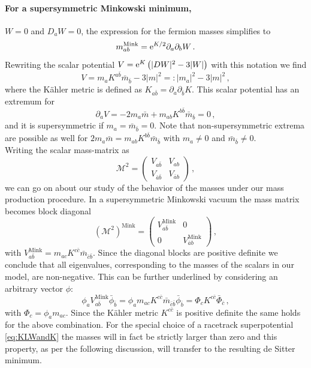 \documentclass[12pt]{report}
\newcommand{\be}{\begin{equation}}
\newcommand{\ee}{\end{equation}}
\def\rme{{\rm e}}
\newcommand{\V}{\mathcal{V}}
\begin{document}
\paragraph{For a supersymmetric Minkowski minimum,} $W = 0$ and $D_aW=0$, the expression for the fermion masses simplifies to
\be 
m_{ab}^{\text{Mink}} = \rme^{K/2} \partial_a \partial_b W\,.
\ee
Rewriting the scalar potential $V=\rme^K \left(|DW|^2 - 3 |W|\right)$ with this notation we find
\be 
V = m_a K^{a\bar{b}}\bar{m}_{\bar{b}} - 3 |m|^2 =: |m_a|^2 - 3 |m|^2\,,
\ee
where the Kähler metric is defined as $K_{a\bar{b}} = \partial_a \partial_{\bar{b}}K$. This scalar potential has an extremum for 
\be 
\partial_a V = -2 m_a \bar{m} + m_{ab} K^{b\bar{b}} \bar{m}_{\bar{b}}=0\,,
\ee
and it is supersymmetric if $m_a = \bar{m}_{\bar{b}}=0$. Note that non-supersymmetric extrema are possible as well for $2 m_a \bar{m} = m_{ab} K^{b\bar{b}} \bar{m}_{\bar{b}}$ with $m_a \neq 0$ and $\bar{m}_{\bar{b}} \neq 0$.\\
Writing the scalar mass-matrix as
\be 
\mathcal{M}^2 = \begin{pmatrix} V_{a\bar{b}} & V_{ab}\\V_{\bar{a}\bar{b}} & V_{\bar{a}b}\end{pmatrix}\,,
\ee
we can go on about our study of the behavior of the masses under our mass production procedure. In a supersymmetric Minkowski vacuum the mass matrix becomes block diagonal
\be 
\left(\mathcal{M}^2\right)^{\text{Mink}} = \begin{pmatrix} V_{a\bar{b}}^{\text{Mink}} &0\\0 & V_{\bar{a}b}^{\text{Mink}}\end{pmatrix}\,,
\ee
with $V_{a\bar{b}}^{\text{Mink}} = m_{ac} K^{c\bar{c}}\bar{m}_{\bar{c}\bar{b}}$. Since the diagonal blocks are positive definite we conclude that all eigenvalues, corresponding to the masses of the scalars in our model, are non-negative. This can be further underlined by considering an arbitrary vector $\phi$:
\be 
\phi_a V_{a\bar{b}}^{\text{Mink}} \bar{\phi}_{\bar{b}} = \phi_a m_{ac} K^{c\bar{c}}\bar{m}_{\bar{c}\bar{b}} \bar{\phi}_{\bar{b}} = \Phi_c K^{c\bar{c}} \bar{\Phi}_{\bar{c}}\,,
\label{eq:MinkPosDef}
\ee
with $\Phi_c = \phi_a m_{ac}$. Since the Kähler metric $K^{c\bar{c}}$ is positive definite the same holds for the above combination. For the special choice of a racetrack superpotential \eqref{eq:KLWandK} the masses will in fact be strictly larger than zero and this property, as per the following discussion, will transfer to the resulting de Sitter minimum. 
\end{document}
